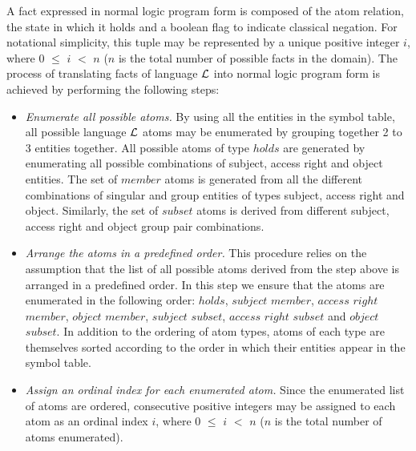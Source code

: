 \documentclass[global,twocolumn,final]{svjour}
\begin{document}
          A fact expressed in normal logic program form is composed of the
          atom relation, the state in which it holds and a boolean flag to
          indicate classical negation. For notational simplicity, this tuple
          may be represented by a unique positive integer $i$, where $0$ $\leq$
          $i$ $<$ $n$ ($n$ is the total number of possible facts in the
          domain). The process of translating facts of language ${\cal L}$
          into normal logic program form is achieved by performing the
          following steps:

          \begin{itemize}

            \item
              {\em Enumerate all possible atoms.}
              By using all the entities in the symbol table, all possible
              language ${\cal L}$ atoms may be enumerated by grouping together
              2 to 3 entities together. All possible atoms of type $holds$ are
              generated by enumerating all possible combinations of subject,
              access right and object entities. The set of $member$ atoms is
              generated from all the different combinations of singular and
              group entities of types subject, access right and object.
              Similarly, the set of $subset$ atoms is derived from different
              subject, access right and object group pair combinations.

            \item
              {\em Arrange the atoms in a predefined order.}
              This procedure relies on the assumption that the list of all
              possible atoms derived from the step above is arranged in a
              predefined order. In this step we ensure that the atoms are
              enumerated in the following order: $holds$, $subject$ $member$,
              $access$ $right$ $member$, $object$ $member$, $subject$
              $subset$, $access$ $right$ $subset$ and $object$ $subset$. In
              addition to the ordering of atom types, atoms of each type are
              themselves sorted according to the order in which their entities
              appear in the symbol table.

            \item
              {\em Assign an ordinal index for each enumerated atom.}
              Since the enumerated list of atoms are ordered, consecutive
              positive integers may be assigned to each atom as an ordinal
              index $i$, where $0$ $\leq$ $i$ $<$ $n$ ($n$ is the total
              number of atoms enumerated).


\end{itemize}
\end{document}
